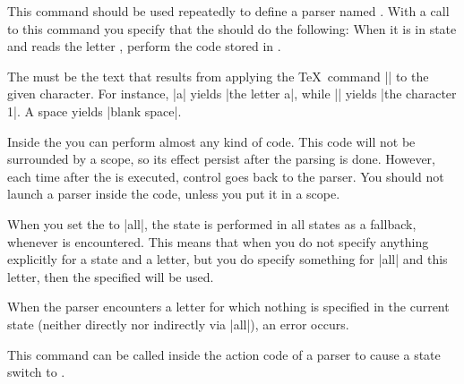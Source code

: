 \begin{command}{\pgfparserdef{}}
  This command should be used repeatedly to define a parser named
  . With a call to this command you specify that the
   should do the following: When it is in state
   and reads the letter , perform the
  code stored in .

  The  must be the text that results from
  applying the \TeX\ command |\meaning| to the given character. For
  instance, |\meaning a| yields |the letter a|, while ||
  yields |the character 1|. A space yields |blank space|.

  Inside the  you can perform almost any kind of
  code. This code will not be surrounded by a scope, so its effect
  persist after the parsing is done. However, each time after the
   is executed, control goes back to the parser. You
  should not launch a parser inside the  code, unless you
  put it in a scope.

  When you set the  to |all|, the state  is
  performed in all states as a fallback, whenever  is encountered. This means that when you do not specify
  anything explicitly for a state and a letter, but you do specify
  something for |all| and this letter, then the specified
   will be used.

  When the parser encounters a letter for which nothing is specified
  in the current state (neither directly nor indirectly via |all|), an
  error occurs.
\end{command}

\begin{command}{\pgfparserswitch{}}
  This command can be called inside the action code of a parser to
  cause a state switch to .
\end{command}
